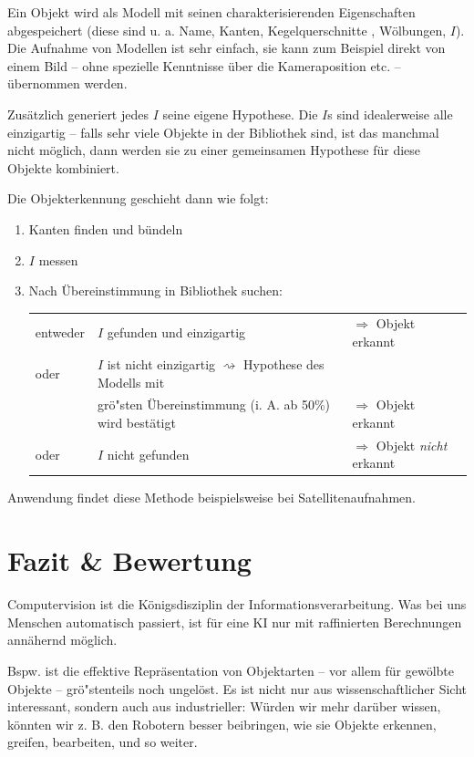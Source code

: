 \begin{itemize}
Ein Objekt wird als Modell mit seinen charakterisierenden Eigenschaften abgespeichert (diese sind u. a. Name, Kanten, Kegelquerschnitte
, Wölbungen, $I$).
Die Aufnahme von Modellen ist sehr einfach, sie kann zum Beispiel direkt von einem Bild -- ohne spezielle Kenntnisse über die Kameraposition etc. -- übernommen werden.

Zusätzlich generiert jedes $I$ seine eigene Hypothese. Die $I$s sind idealerweise alle einzigartig -- falls sehr viele Objekte in der Bibliothek sind, ist das manchmal nicht möglich, dann werden sie zu einer gemeinsamen Hypothese für diese Objekte kombiniert.

Die Objekterkennung geschieht dann wie folgt:
\begin{enumerate}
\item Kanten finden und bündeln
\item $I$ messen
\item Nach Übereinstimmung in Bibliothek suchen:
\begin{table}[h]
\centering
\begin{tabular}{lll}
entweder & $I$ gefunden und einzigartig & $\Rightarrow$ Objekt erkannt \\
oder & $I$ ist nicht einzigartig $\rightsquigarrow$ Hypothese des Modells mit &  \\
 & grö"sten Übereinstimmung (i. A. ab 50\%) wird bestätigt & $\Rightarrow$ Objekt erkannt \\
oder & $I$ nicht gefunden & $\Rightarrow$ Objekt \textit{nicht} erkannt
\end{tabular}
\end{table}
\end{enumerate}
Anwendung findet diese Methode beispielsweise bei Satellitenaufnahmen.
\end{itemize}

\section{Fazit \& Bewertung}

Computervision ist die Königsdisziplin der Informationsverarbeitung. Was bei uns Menschen automatisch passiert, ist für eine KI nur mit raffinierten Berechnungen annähernd möglich.

Bspw. ist die effektive Repräsentation von Objektarten -- vor allem für gewölbte Objekte -- grö"stenteils noch ungelöst. Es ist nicht nur aus wissenschaftlicher Sicht interessant, sondern auch aus industrieller: Würden wir mehr darüber wissen, könnten wir z. B. den Robotern besser beibringen, wie sie Objekte erkennen, greifen, bearbeiten, und so weiter.

